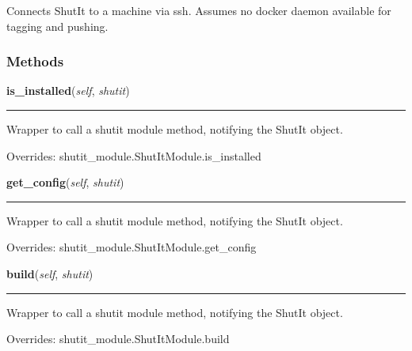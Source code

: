 Connects ShutIt to a machine via ssh. Assumes no docker daemon available 
for tagging and pushing.



  \subsubsection{Methods}

    \vspace{0.5ex}

\hspace{.8\funcindent}\begin{boxedminipage}{\funcwidth}

    \raggedright \textbf{is\_installed}(\textit{self}, \textit{shutit})

    \vspace{-1.5ex}

    \rule{\textwidth}{0.5\fboxrule}
\setlength{\parskip}{2ex}
    Wrapper to call a shutit module method, notifying the ShutIt object.

\setlength{\parskip}{1ex}
      Overrides: shutit\_module.ShutItModule.is\_installed

    \end{boxedminipage}

    \vspace{0.5ex}

\hspace{.8\funcindent}\begin{boxedminipage}{\funcwidth}

    \raggedright \textbf{get\_config}(\textit{self}, \textit{shutit})

    \vspace{-1.5ex}

    \rule{\textwidth}{0.5\fboxrule}
\setlength{\parskip}{2ex}
    Wrapper to call a shutit module method, notifying the ShutIt object.

\setlength{\parskip}{1ex}
      Overrides: shutit\_module.ShutItModule.get\_config

    \end{boxedminipage}

    \vspace{0.5ex}

\hspace{.8\funcindent}\begin{boxedminipage}{\funcwidth}

    \raggedright \textbf{build}(\textit{self}, \textit{shutit})

    \vspace{-1.5ex}

    \rule{\textwidth}{0.5\fboxrule}
\setlength{\parskip}{2ex}
    Wrapper to call a shutit module method, notifying the ShutIt object.

\setlength{\parskip}{1ex}
      Overrides: shutit\_module.ShutItModule.build

    \end{boxedminipage}

